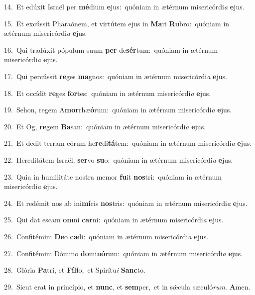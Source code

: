 {\numbfont\textcolor{\numbcolor}{14.}}~Et edúxit Israël per \textbf{mé}\-dium \textbf{e}\-jus:~\star quóniam in ætérnum misericórdi\textit{a} \textbf{e}\-jus.\par
{\numbfont\textcolor{\numbcolor}{15.}}~Et excússit Pharaónem, et virtútem ejus in \textbf{Ma}\-ri \textbf{Ru}\-bro:~\star quóniam in ætérnum misericórdi\textit{a} \textbf{e}\-jus.\par
{\numbfont\textcolor{\numbcolor}{16.}}~Qui tradúxit pópulum suum \textbf{per} de\-\textbf{sér}\-tum:~\star quóniam in ætérnum misericórdi\textit{a} \textbf{e}\-jus.\par
{\numbfont\textcolor{\numbcolor}{17.}}~Qui percússit \textbf{re}\-ges \textbf{ma}\-gnos:~\star quóniam in ætérnum misericórdi\textit{a} \textbf{e}\-jus.\par
{\numbfont\textcolor{\numbcolor}{18.}}~Et occídit \textbf{re}\-ges \textbf{for}\-tes:~\star quóniam in ætérnum misericórdi\textit{a} \textbf{e}\-jus.\par
{\numbfont\textcolor{\numbcolor}{19.}}~Sehon, regem A\-\textbf{mor}\-rhæ\-\textbf{ó}\-rum:~\star quóniam in ætérnum misericórdi\textit{a} \textbf{e}\-jus.\par
{\numbfont\textcolor{\numbcolor}{20.}}~Et Og, \textbf{re}\-gem \textbf{Ba}\-san:~\star quóniam in ætérnum misericórdi\textit{a} \textbf{e}\-jus.\par
{\numbfont\textcolor{\numbcolor}{21.}}~Et dedit terram eórum he\-\textbf{re}\-di\-\textbf{tá}\-tem:~\star quóniam in ætérnum misericórdi\textit{a} \textbf{e}\-jus.\par
{\numbfont\textcolor{\numbcolor}{22.}}~Hereditátem Israël, \textbf{ser}\-vo \textbf{su}\-o:~\star quóniam in ætérnum misericórdi\textit{a} \textbf{e}\-jus.\par
{\numbfont\textcolor{\numbcolor}{23.}}~Quia in humilitáte nostra memor \textbf{fu}\-it \textbf{nos}\-tri:~\star quóniam in ætérnum misericórdi\textit{a} \textbf{e}\-jus.\par
{\numbfont\textcolor{\numbcolor}{24.}}~Et redémit nos ab ini\-\textbf{mí}\-cis \textbf{nos}\-tris:~\star quóniam in ætérnum misericórdi\textit{a} \textbf{e}\-jus.\par
{\numbfont\textcolor{\numbcolor}{25.}}~Qui dat escam \textbf{om}\-ni \textbf{car}\-ni:~\star quóniam in ætérnum misericórdi\textit{a} \textbf{e}\-jus.\par
{\numbfont\textcolor{\numbcolor}{26.}}~Confitémini \textbf{De}\-o \textbf{cæ}\-li:~\star quóniam in ætérnum misericórdi\textit{a} \textbf{e}\-jus.\par
{\numbfont\textcolor{\numbcolor}{27.}}~Confitémini Dómino \textbf{do}\-mi\-\textbf{nó}\-rum:~\star quóniam in ætérnum misericórdi\textit{a} \textbf{e}\-jus.\par
{\numbfont\textcolor{\numbcolor}{28.}}~Glória \textbf{Pa}\-tri, et \textbf{Fí}\-\textbf{li}o,~\star et Spirítu\textit{i} \textbf{Sanc}\-to.\par
{\numbfont\textcolor{\numbcolor}{29.}}~Sicut erat in princípio, et \textbf{nunc}\-, et \textbf{sem}\-per,~\star et in sǽcula sæculó\-\textit{rum}\-. \textbf{A}\-men.\par
